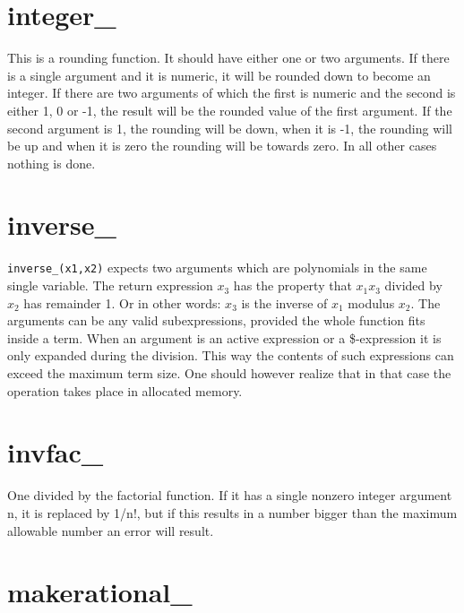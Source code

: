 
\section{integer\_}
\label{funinteger}
\noindent This is a rounding function. It should have 
either one or two arguments. If there is a single argument and it is 
numeric, it will be rounded down to become an integer. If there are two 
arguments of which the first is numeric and the second is either 1, 0 or 
-1, the result will be the rounded value of the first argument. If the 
second argument is 1, the rounding will be down, when it is -1, the 
rounding will be up and when it is zero the rounding will be towards zero. 
In all other cases nothing is done.


\section{inverse\_}
\label{funinverse}
\noindent \verb:inverse_(x1,x2): expects two arguments which are 
polynomials in the same single variable. The return expression $x_3$ 
has the property that $x_1 x_3$ divided by $x_2$ has remainder 1. Or in 
other words: $x_3$ is the inverse of $x_1$ modulus $x_2$.
The arguments can be any valid subexpressions, provided the whole function 
fits inside a term. When an argument is an active expression or a 
\$-expression it is only expanded during the division. This way the 
contents of such expressions can exceed the maximum term size. One should 
however realize that in that case the operation takes place in allocated 
memory. 


\section{invfac\_}
\label{funinvfac}
\noindent One divided by the factorial function. If it has 
a single nonzero integer argument n, it is replaced by 1/n!, but if this 
results in a number bigger than the maximum allowable number an error will 
result.


\section{makerational\_}
\label{funmakerational}

